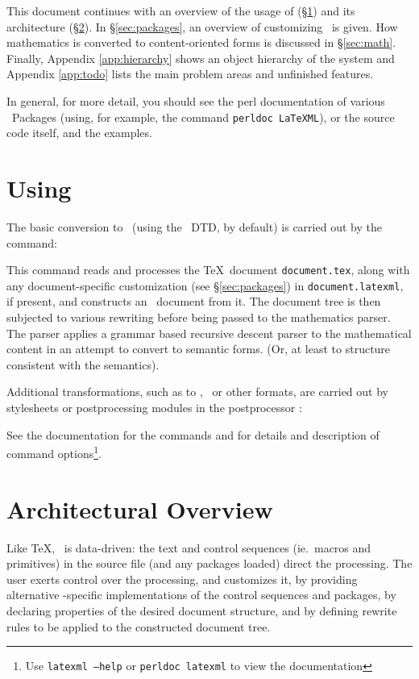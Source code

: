 \documentclass{article}
\begin{document}
\medskip
This document continues with an overview of the usage of \LaTeXML (\S\ref{sec:usage})
and its architecture (\S\ref{sec:architecture}).   
In \S\ref{sec:packages}, an overview of customizing \LaTeXML\ is given.
How mathematics is converted to content-oriented forms is discussed in \S\ref{sec:math}.
Finally, Appendix \ref{app:hierarchy} shows an object hierarchy of the system
and Appendix \ref{app:todo} lists the main problem areas and unfinished features.

In general, for more detail, you should see the perl documentation of various
\LaTeXML\ Packages (using, for example, the command \texttt{perldoc LaTeXML}),
or the source code itself, and the examples.

\section{Using \LaTeXML}\label{sec:usage}
The basic conversion to \XML\ (using the \LaTeXML\ DTD, by default) is carried out
by the command:
\begin{quote}
\end{quote}
This command reads and processes the \TeX\ document \texttt{document.tex},
along with any document-specific customization (see \S\ref{sec:packages})
in \texttt{document.latexml}, if present,
and constructs an \XML\ document from it.  The document tree is then subjected to various 
rewriting before being passed to the mathematics parser.  The parser applies a grammar based
recursive descent parser to the mathematical content in an attempt to convert
to semantic forms.  (Or, at least to structure consistent with the semantics).

Additional transformations, such as to \HTML, \MathML\ or other formats, are carried out
by stylesheets or postprocessing modules in the postprocessor :
\begin{quote}
\end{quote}

See the documentation for the commands  and  for details
and description of command options\footnote{Use \texttt{latexml --help} or 
\texttt{perldoc latexml} to view the documentation}.

\section{Architectural Overview}\label{sec:architecture}
Like \TeX, \LaTeXML\ is data-driven: the text and control sequences (ie.~macros and primitives)
in the source file (and any packages loaded) direct the processing.
The user exerts control over the processing, and customizes it, by 
providing alternative \LaTeXML-specific implementations of the control sequences and packages,
by declaring properties of the desired document structure,
and by defining rewrite rules to be applied to the constructed document tree.
\end{document}
